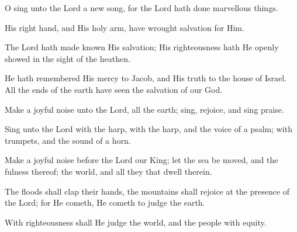 O sing unto the Lord a new song, for the Lord hath done marvellous things.

His right hand, and His holy arm, have wrought salvation for Him.

The Lord hath made known His salvation; His righteousness hath He openly showed in the sight of the heathen.

He hath remembered His mercy to Jacob, and His truth to the house of Israel. All the ends of the earth have seen the salvation of our God.

Make a joyful noise unto the Lord, all the earth; sing, rejoice, and sing praise.

Sing unto the Lord with the harp, with the harp, and the voice of a psalm; with trumpets, and the sound of a horn.

Make a joyful noise before the Lord our King; let the sea be moved, and the fulness thereof; the world, and all they that dwell therein.

The floods shall clap their hands, the mountains shall rejoice at the presence of the Lord; for He cometh, He cometh to judge the earth.

With righteousness shall He judge the world, and the people with equity.

